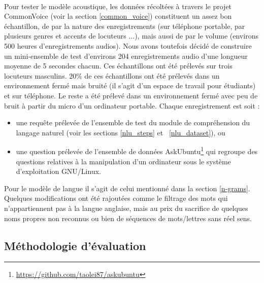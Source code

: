 	\paragraph{}
	Pour tester le modèle acoustique, les données récoltées à travers le projet CommonVoice (voir la section \ref{common_voice}) constituent un assez bon échantillon, de par la nature des enregistrements (sur téléphone portable, par plusieurs genres et accents de locuteurs ...), mais aussi de par le volume (environs 500 heures d'enregistrements audios). Nous avons toutefois décidé de construire un mini-ensemble de test d'environs 204 enregistrements audio d'une longueur moyenne de 5 secondes chacun. Ces échantillons ont été prélevés sur trois locuteurs masculins. $20\%$ de ces échantillons ont été prélevés dans un environnement fermé mais bruité (il s'agit d'un espace de travail pour étudiants) et sur téléphone. Le reste a été prélevé dans un environnement fermé avec peu de bruit à partir du micro d'un ordinateur portable. Chaque enregistrement est soit : 
	\begin{itemize}
		\item une requête prélevée de l'ensemble de test du module de compréhension du langage naturel (voir les sections \ref{nlu_steps} et ~\ref{nlu_dataset}), ou
		
		\item une question prélevée de l'ensemble de données AskUbuntu\footnote{\url{https://github.com/taolei87/askubuntu}} qui regroupe des questions relatives à la manipulation d'un ordinateur sous le système d'exploitation GNU/Linux.
	\end{itemize}
	\par
	Pour le modèle de langue il s'agit de celui mentionné dans la section 
	\ref{n-grams}. Quelques modifications ont été rajoutées comme le filtrage des mots qui n'appartiennent pas à la langue anglaise, mais au prix du sacrifice de quelques noms propres non reconnus ou bien de séquences de mots/lettres sans réel sens.
	\subsection{Méthodologie d'évaluation}
